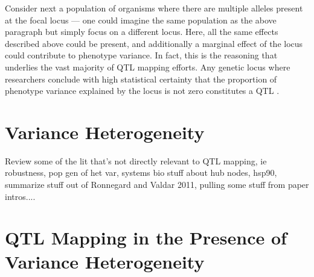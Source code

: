 Consider next a population of organisms where there are multiple alleles present at the focal locus --- one could imagine the same population as the above paragraph but simply focus on a different locus.
Here, all the same effects described above could be present, and additionally a marginal effect of the locus could contribute to phenotype variance.
In fact, this is the reasoning that underlies the vast majority of QTL mapping efforts.
Any genetic locus where researchers conclude with high statistical certainty that the proportion of phenotype variance explained by the locus is not zero constitutes a QTL \citep{Broman2009,Broman2010}.


\section{Variance Heterogeneity}

Review some of the lit that's not directly relevant to QTL mapping,
ie robustness, pop gen of het var, systems bio stuff about hub  nodes, hsp90, summarize stuff out of Ronnegard and Valdar 2011, pulling some stuff from paper intros....






\section{QTL Mapping in the Presence of Variance Heterogeneity}


